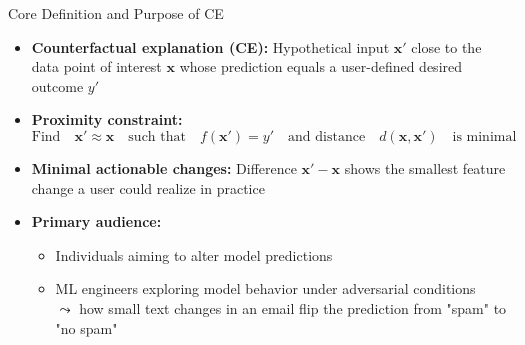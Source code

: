 \documentclass[10pt,compress,t,notes=noshow, xcolor=table]{beamer}
\begin{document}


\begin{frame}{Core Definition and Purpose of CE}
  \begin{itemize}
    \item<1-> \textbf{Counterfactual explanation (CE):} Hypothetical input \(\mathbf{x}'\) close to the data point of interest $\mathbf{x}$ whose prediction equals a user-defined desired outcome \(y'\)
    \item<2-> \textbf{Proximity constraint:} %
      \[
      \text{Find} \quad \mathbf{x}' \approx \mathbf{x} \quad\text{such that} \quad f(\mathbf{x}') = y' \quad\text{and distance}\quad 
        d(\mathbf{x},\mathbf{x}') \quad \text{is minimal}
      \]
    \item<3-> \textbf{Minimal actionable changes:} Difference \(\mathbf{x}'-\mathbf{x}\) shows the smallest feature change a user could realize in practice
    \item<4-> \textbf{Primary audience:} 
    \begin{itemize}
        \item Individuals aiming to alter model predictions 
        \item ML engineers exploring model behavior under adversarial conditions\\
        $\leadsto$ how small text changes in an email flip the prediction from "spam" to "no spam"
    \end{itemize}
  \end{itemize}
\end{frame}
\end{document}
